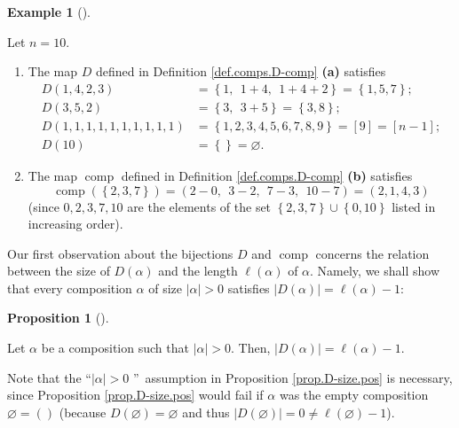 \documentclass[numbers=enddot,12pt,final,onecolumn,notitlepage]{scrartcl}%
\theoremstyle{definition}
\newtheorem{prop}[theo]{Proposition}
\newenvironment{proposition}[1][]
{\begin{prop}[#1]\begin{leftbar}}
{\end{leftbar}\end{prop}}
\newtheorem{exam}[theo]{Example}
\newenvironment{example}[1][]
{\begin{exam}[#1]\begin{leftbar}}
{\end{leftbar}\end{exam}}
\begin{document}
\begin{example}
Let $n=10$.

\begin{enumerate}
\item[\textbf{(a)}] The map $D$ defined in Definition \ref{def.comps.D-comp}
\textbf{(a)} satisfies%
\begin{align*}
D\left(  1,4,2,3\right)   &  =\left\{  1,\ \ 1+4,\ \ 1+4+2\right\}  =\left\{
1,5,7\right\}  ;\\
D\left(  3,5,2\right)   &  =\left\{  3,\ \ 3+5\right\}  =\left\{  3,8\right\}
;\\
D\left(  1,1,1,1,1,1,1,1,1,1\right)   &  =\left\{  1,2,3,4,5,6,7,8,9\right\}
=\left[  9\right]  =\left[  n-1\right]  ;\\
D\left(  10\right)   &  =\left\{  {}\right\}  =\varnothing.
\end{align*}


\item[\textbf{(b)}] The map $\operatorname*{comp}$ defined in Definition
\ref{def.comps.D-comp} \textbf{(b)} satisfies%
\[
\operatorname*{comp}\left(  \left\{  2,3,7\right\}  \right)  =\left(
2-0,\ \ 3-2,\ \ 7-3,\ \ 10-7\right)  =\left(  2,1,4,3\right)
\]
(since $0,2,3,7,10$ are the elements of the set $\left\{  2,3,7\right\}
\cup\left\{  0,10\right\}  $ listed in increasing order).
\end{enumerate}
\end{example}

Our first observation about the bijections $D$ and $\operatorname*{comp}$
concerns the relation between the size of $D\left(  \alpha\right)  $ and the
length $\ell\left(  \alpha\right)  $ of $\alpha$. Namely, we shall show that
every composition $\alpha$ of size $\left\vert \alpha\right\vert >0$ satisfies
$\left\vert D\left(  \alpha\right)  \right\vert =\ell\left(  \alpha\right)
-1$:

\begin{proposition}
\label{prop.D-size.pos}Let $\alpha$ be a composition such that $\left\vert
\alpha\right\vert >0$. Then, $\left\vert D\left(  \alpha\right)  \right\vert
=\ell\left(  \alpha\right)  -1$.
\end{proposition}

Note that the \textquotedblleft$\left\vert \alpha\right\vert >0$%
\textquotedblright\ assumption in Proposition \ref{prop.D-size.pos} is
necessary, since Proposition \ref{prop.D-size.pos} would fail if $\alpha$ was
the empty composition $\varnothing=\left(  {}\right)  $ (because $D\left(
\varnothing\right)  =\varnothing$ and thus $\left\vert D\left(  \varnothing
\right)  \right\vert =0\neq\ell\left(  \varnothing\right)  -1$).
\end{document}

